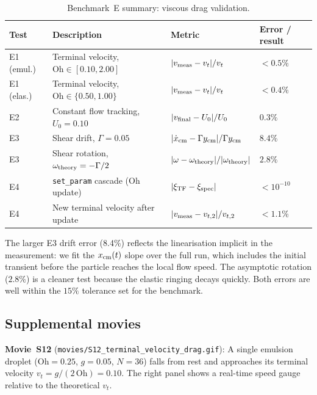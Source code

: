 \documentclass[aps,pre,twocolumn,floatfix,longbibliography]{revtex4-2}
\begin{document}
\begin{table}[htb]
\caption{Benchmark~E summary: viscous drag validation.}
\label{tab:drag_benchmarks}
\begin{ruledtabular}
\begin{tabular}{llll}
  Test & Description & Metric & Error / result \\
\hline
  E1 (emul.) & Terminal velocity, $\mathrm{Oh} \in [0.10,2.00]$
             & $|v_{\rm meas} - v_t|/v_t$ & $< 0.5\%$ \\
  E1 (elas.) & Terminal velocity, $\mathrm{Oh} \in \{0.50,1.00\}$
             & $|v_{\rm meas} - v_t|/v_t$ & $< 0.4\%$ \\
  E2         & Constant flow tracking, $U_0 = 0.10$
             & $|v_{\rm final} - U_0|/U_0$ & $0.3\%$ \\
  E3         & Shear drift, $\Gamma = 0.05$
             & $|\dot{x}_{\rm cm} - \Gamma y_{\rm cm}|/\Gamma y_{\rm cm}$
             & $8.4\%$ \\
  E3         & Shear rotation, $\omega_{\rm theory} = -\Gamma/2$
             & $|\omega - \omega_{\rm theory}|/|\omega_{\rm theory}|$
             & $2.8\%$ \\
  E4         & \texttt{set\_param} cascade (Oh update)
             & $|\xi_{\rm TF} - \xi_{\rm spec}|$ & $< 10^{-10}$ \\
  E4         & New terminal velocity after update
             & $|v_{\rm meas} - v_{t,2}|/v_{t,2}$ & $< 1.1\%$ \\
\end{tabular}
\end{ruledtabular}
\end{table}

The larger E3 drift error (8.4\%) reflects the linearisation implicit in the
measurement: we fit the $x_{\rm cm}(t)$ slope over the full run, which includes
the initial transient before the particle reaches the local flow speed.  The
asymptotic rotation ($2.8\%$) is a cleaner test because the elastic ringing
decays quickly.  Both errors are well within the $15\%$ tolerance set for the
benchmark.

\subsection{Supplemental movies}
\label{sec:drag_movies}

\textbf{Movie~S12} (\texttt{movies/S12\_terminal\_velocity\_drag.gif}):
A single emulsion droplet ($\mathrm{Oh} = 0.25$, $g = 0.05$, $N = 36$) falls
from rest and approaches its terminal velocity $v_t = g/(2\,\mathrm{Oh}) = 0.10$.
The right panel shows a real-time speed gauge relative to the theoretical $v_t$.
\end{document}
